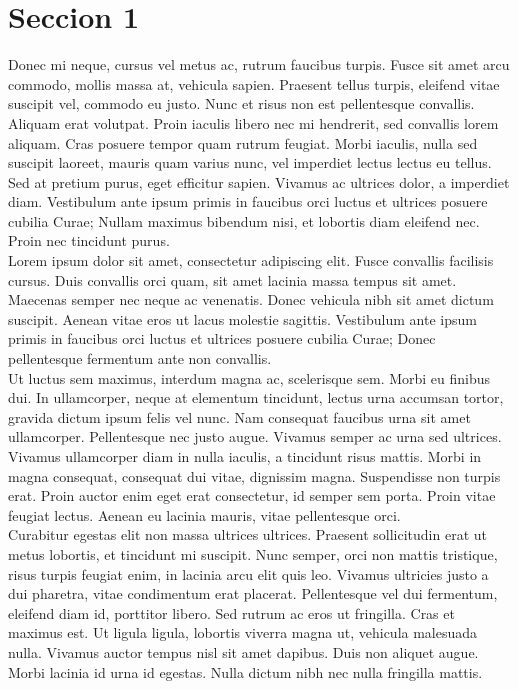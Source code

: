 \section{Seccion 1}

Donec mi neque, cursus vel metus ac, rutrum faucibus turpis. Fusce sit amet arcu commodo, mollis massa at, vehicula sapien. Praesent tellus turpis, eleifend vitae suscipit vel, commodo eu justo. Nunc et risus non est pellentesque convallis. Aliquam erat volutpat. Proin iaculis libero nec mi hendrerit, sed convallis lorem aliquam. Cras posuere tempor quam rutrum feugiat. Morbi iaculis, nulla sed suscipit laoreet, mauris quam varius nunc, vel imperdiet lectus lectus eu tellus. Sed at pretium purus, eget efficitur sapien. Vivamus ac ultrices dolor, a imperdiet diam. Vestibulum ante ipsum primis in faucibus orci luctus et ultrices posuere cubilia Curae; Nullam maximus bibendum nisi, et lobortis diam eleifend nec. Proin nec tincidunt purus.
\\


Lorem ipsum dolor sit amet, consectetur adipiscing elit. Fusce convallis facilisis cursus. Duis convallis orci quam, sit amet lacinia massa tempus sit amet. Maecenas semper nec neque ac venenatis. Donec vehicula nibh sit amet dictum suscipit. Aenean vitae eros ut lacus molestie sagittis. Vestibulum ante ipsum primis in faucibus orci luctus et ultrices posuere cubilia Curae; Donec pellentesque fermentum ante non convallis.
\\

Ut luctus sem maximus, interdum magna ac, scelerisque sem. Morbi eu finibus dui. In ullamcorper, neque at elementum tincidunt, lectus urna accumsan tortor, gravida dictum ipsum felis vel nunc. Nam consequat faucibus urna sit amet ullamcorper. Pellentesque nec justo augue. Vivamus semper ac urna sed ultrices. Vivamus ullamcorper diam in nulla iaculis, a tincidunt risus mattis. Morbi in magna consequat, consequat dui vitae, dignissim magna. Suspendisse non turpis erat. Proin auctor enim eget erat consectetur, id semper sem porta. Proin vitae feugiat lectus. Aenean eu lacinia mauris, vitae pellentesque orci.
\\

Curabitur egestas elit non massa ultrices ultrices. Praesent sollicitudin erat ut metus lobortis, et tincidunt mi suscipit. Nunc semper, orci non mattis tristique, risus turpis feugiat enim, in lacinia arcu elit quis leo. Vivamus ultricies justo a dui pharetra, vitae condimentum erat placerat. Pellentesque vel dui fermentum, eleifend diam id, porttitor libero. Sed rutrum ac eros ut fringilla. Cras et maximus est. Ut ligula ligula, lobortis viverra magna ut, vehicula malesuada nulla. Vivamus auctor tempus nisl sit amet dapibus. Duis non aliquet augue. Morbi lacinia id urna id egestas. Nulla dictum nibh nec nulla fringilla mattis.
\\

